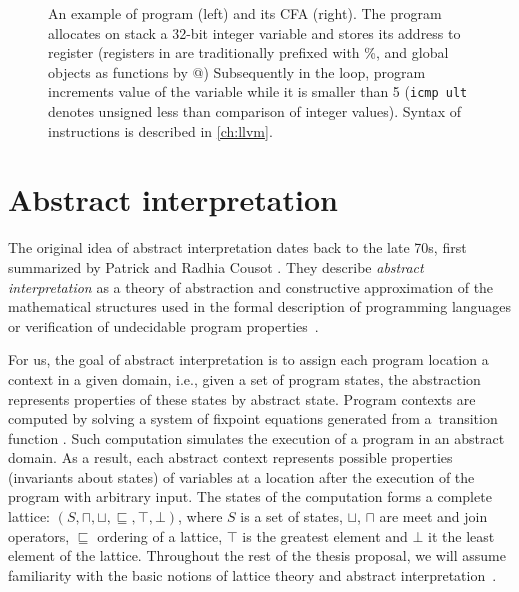 \begin{figure}
\begin{minipage}[t]{0.48\textwidth}
\begin{tikzpicture}[node distance=1.1em]
\end{tikzpicture}
\end{minipage}

\caption{An example of \llvm program (left) and its CFA (right).  The program
allocates on stack a 32-bit integer variable and stores its address to register
 (registers in \llvm are traditionally prefixed with \%,
and global objects as functions by @) Subsequently in the loop, program
increments value of the variable while it is smaller than 5 (\texttt{icmp ult}
denotes unsigned less than comparison of integer values). Syntax of \llvm
instructions is described in \autoref{ch:llvm}.}
\label{fig:cfa}
\end{figure}

\section{Abstract interpretation}
\label{sec:abstraction}

The original idea of abstract interpretation dates back to the late 70s, first
summarized by Patrick and Radhia Cousot \cite{Cousot1977}.
They describe \emph{abstract interpretation} as a theory of abstraction and
constructive approximation of the mathematical structures used in the formal
description of programming languages or verification of undecidable program
properties~\cite{Cousot2012}.

For us, the goal of abstract interpretation is to assign each program location
a context in a given domain, i.e., given a set of program states, the
abstraction represents properties of these states by abstract state. Program
contexts are computed by solving a system of fixpoint equations generated from
a~transition function \cite{Cousot1977}. Such computation simulates the
execution of a program in an abstract domain. As a result, each abstract
context represents possible properties (invariants about states) of variables
at a location after the execution of the program with arbitrary input. The
states of the computation forms a complete lattice:
$(S, \sqcap, \sqcup, \sqsubseteq, \top, \bot)$, where $S$ is a set of states,
$\sqcup$, $\sqcap$ are meet and join operators, $\sqsubseteq$ ordering of a
lattice, $\top$ is the greatest element and $\bot$ it the least element of the
lattice. Throughout the rest of the thesis proposal, we will assume familiarity
with the basic notions of lattice theory \cite{Birkhoff1940} and abstract
interpretation~\cite{Cousot1977}.


